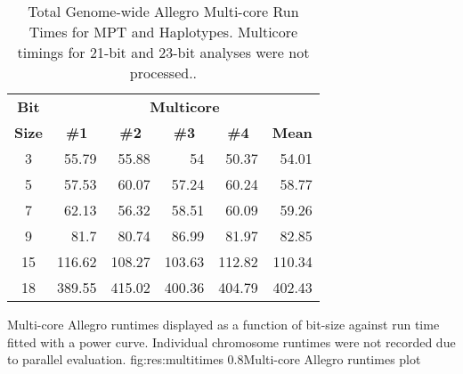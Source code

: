 \begin{table}[h]
\begin{center}
\begin{tabular}{crrrrr}\toprule
\textbf{Bit}  & \multicolumn{5}{c}{\textbf{Multicore}}  \\
\textbf{Size} & \multicolumn{1}{c}{\textbf{\#1}} & \multicolumn{1}{c}{\textbf{\#2}} & \multicolumn{1}{c}{\textbf{\#3}} & \multicolumn{1}{c}{\textbf{\#4}} & \multicolumn{1}{c}{\textbf{Mean}} \\
\midrule
3             & 55.79                            & 55.88                            & 54                               & 50.37                            & 54.01                             \\
5             & 57.53                            & 60.07                            & 57.24                            & 60.24                            & 58.77                             \\
7             & 62.13                            & 56.32                            & 58.51                            & 60.09                            & 59.26                             \\
9             & 81.7                             & 80.74                            & 86.99                            & 81.97                            & 82.85                             \\
15            & 116.62                           & 108.27                           & 103.63                           & 112.82                           & 110.34                            \\
18            & 389.55                           & 415.02                           & 400.36                           & 404.79                           & 402.43                            \\
\hline
\end{tabular}
\end{center}
\vspace{-15pt}
\caption[Total Genome-wide Allegro Multi-core Run Times for MPT and Haplotype Reconstruction]{Total Genome-wide Allegro Multi-core Run Times for MPT and Haplotypes. Multicore timings for 21-bit and 23-bit analyses were not processed..}\label{table:res:allegromultiruntimes}
\end{table}

	{Multi-core Allegro runtimes displayed as a function of bit-size against run time fitted with a power curve. Individual chromosome runtimes were not recorded due to parallel evaluation.}
	{fig:res:multitimes}
	{0.8}{Multi-core Allegro runtimes plot}

